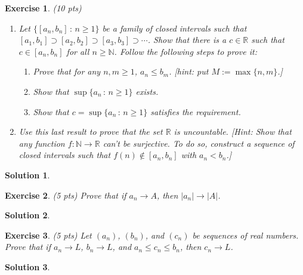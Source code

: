 \documentclass[12pt]{article}
\newcommand{\bR}{\mathbb{R}}
\newcommand{\bN}{\mathbb{N}}
\newcommand{\ra}{\rightarrow}
\theoremstyle{plain}
\newtheorem{exer}{\textbf{Exercise}}}
\theoremstyle{plain}
\newtheorem*{sol}{\textbf{Solution}}}
\begin{document}
\begin{exer}
(10 pts)
\begin{enumerate}[label=\textbf{\alph*)}]
\item Let $\{ [a_n , b_n ] \, : \, n \geq 1\}$ be a family of closed intervals such that $[a_1 , b_1] \supset [a_2 , b_2] \supset [a_3, b_3] \supset \cdots$. Show that there is a $c \in \bR$ such that $c \in [a_n , b_n ]$ for all $n \geq \bN$. Follow the following steps to prove it:
	\begin{enumerate}[label=\textbf{(\roman*)}]
	\item Prove that for any $n, m \geq 1$, $a_n \leq b_m$. [hint: put $M := \max \{ n , m \}$.]
	\item Show that $\sup \{ a_n\, : \, n \geq 1 \}$ exists.
	\item Show that $c = \sup \{ a_n \, : \, n \geq 1\}$ satisfies the requirement.	
	\end{enumerate}
\item Use this last result to prove that the set $\bR$ is uncountable. [Hint: Show that any function $f : \bN \ra \bR$ can't be surjective. To do so, construct a sequence of closed intervals such that $f(n) \not\in [a_n , b_n]$ with $a_n < b_n$.]
\end{enumerate}
\end{exer}
\begin{sol}

\end{sol}


\begin{exer}
(5 pts)
Prove that if $a_n \ra A$, then $|a_n| \ra |A|$.
\end{exer}
\begin{sol}

\end{sol}

\begin{exer}
(5 pts)
Let $(a_n)$, $(b_n)$, and $(c_n)$ be sequences of real numbers. Prove that if $a_n \ra L$, $b_n \ra L$, and $a_n \leq c_n \leq b_n$, then $c_n \ra L$.
\end{exer}
\begin{sol}

\end{sol}
\end{document}
